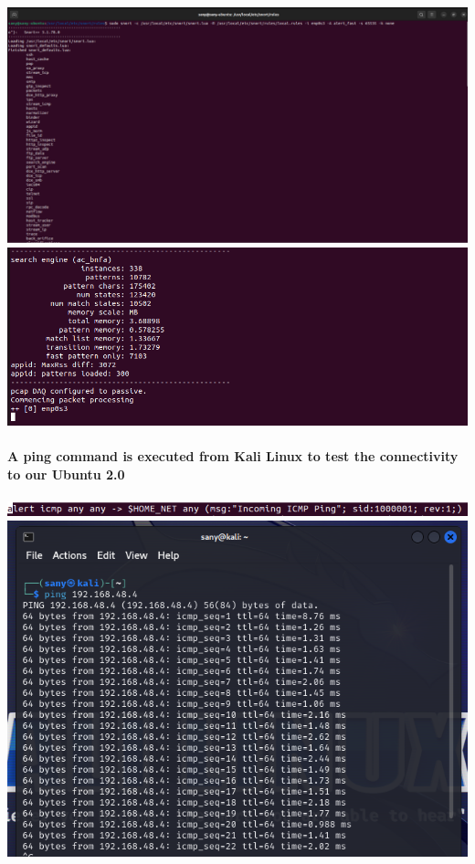 \documentclass{article}
\begin{document}
\includegraphics[width=1.0\textwidth]{images/manual_trig_1.PNG}
\includegraphics[width=1.0\textwidth]{images/manual_trig_2.PNG}\\\\
\clearpage
\textbf{A ping command is executed from Kali Linux to test the connectivity to our Ubuntu 2.0}\\\\
\includegraphics[width=1.0\textwidth]{images/ping1.PNG}
\includegraphics[width=1.0\textwidth,height=0.4\textheight]{images/ping2.PNG}
\end{document}
